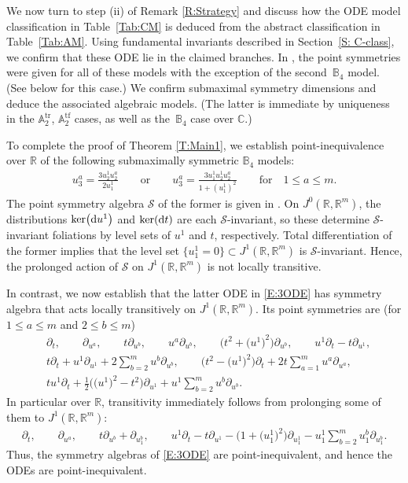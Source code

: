 \documentclass[10pt,a4paper]{amsart}
\newcommand\cS{\mathcal{S}}
\DeclareMathOperator{\tf}{tf}
\DeclareMathOperator{\tr}{tr}
\newcommand{\R}{\mathbb{R}}
\newcommand{\C}{\mathbb{C}}
\newcommand\bbA{\mathbb{A}}
\newcommand\bbB{\mathbb{B}}
\numberwithin{equation}{section}
\begin{document}
 We now turn to step (ii) of Remark \ref{R:Strategy} and discuss how the ODE model classification in Table~\ref{Tab:CM} is deduced from the abstract classification in Table~\ref{Tab:AM}. Using fundamental invariants described in Section~\ref{S: C-class}, we confirm that these ODE lie in the claimed branches. In \cite[Table~10]{KT2021}, the point symmetries were given for all of these models with the exception of the second~$\bbB_4$ model. (See below for this case.) We confirm submaximal symmetry dimensions and deduce the associated algebraic models. (The latter is immediate by uniqueness in the $\bbA_2^{\tr}$, $\bbA_2^{\tf}$ cases, as well as the~$\bbB_4$ case over $\C$.)

To complete the proof of Theorem \ref{T:Main1}, we establish point-inequivalence over $\R$ of the following submaximally symmetric $\bbB_4$ models:
\begin{align}\label{E:3ODE}
u_3^a= \frac{3u_2^1 u_2^a}{2u^1_1} \qquad \text{or} \qquad u_3^a= \frac{3u_1^1u_2^1 u_2^a}{1 + (u^1_1)^2} \qquad \text{for}\quad 1 \leq a \leq m.
\end{align}
The point symmetry algebra $\cS$ of the former is given in \cite[Table 10]{KT2021}. On $J^0(\R,\R^m)$, the distributions $\ker\bigl({\rm d}u^1\bigr)$ and $\ker({\rm d}t)$ are each $\cS$-invariant, so these determine $\cS$-invariant foliations by level sets of $u^1$ and $t$, respectively. Total differentiation of the former implies that the level set $\bigl\{u_1^1=0\bigr\} \subset J^1(\R,\R^m)$ is $\cS$-invariant. Hence, the prolonged action of $\cS$ on $J^1(\R,\R^m)$ is not locally transitive.

In contrast, we now establish that the latter ODE in \eqref{E:3ODE} has symmetry algebra that acts locally transitively on $J^1(\R,\R^m)$. Its point symmetries are (for $1 \le a \le m$ and $2 \le b \le m$)
\begin{align*}%
&\partial_t, \qquad \partial_{u^a}, \qquad t \partial_{u^b}, \qquad u^a\partial_{u^b}, \qquad \bigl(t^2 + \bigl(u^1\bigr)^2\bigr)\partial_{u^b}, \qquad u^1\partial_t -t\partial_{u^1}, \\
& t\partial_t + u^1\partial_{u^1} + 2 \sum_{b=2}^m u^b\partial_{u^b}, \qquad \bigl(t^2-\bigl(u^1\bigr)^2\bigr)\partial_t + 2t\sum_{a=1}^m u^a \partial_{u^a}, \\
& tu^1\partial_t + \frac{1}{2}\bigl(\bigl(u^1\bigr)^2-t^2\bigr)\partial_{u^1} + u^1\sum_{b=2}^m u^b\partial_{u^b}.
\end{align*}
In particular over $\R$, transitivity immediately follows from prolonging some of them to $J^1(\R,\R^m\!)$:
\begin{align*}
 \partial_t, \qquad
 \partial_{u^a}, \qquad
 t\partial_{u^b} + \partial_{u^b_1}, \qquad
 u^1\partial_t - t\partial_{u^1} - \bigl(1 + \bigl(u^1_1\bigr)^2\bigr) \partial_{u^1_1} - u^1_1 \sum_{b=2}^m u^b_1 \partial_{u^b_1}.
\end{align*}
Thus, the symmetry algebras of \eqref{E:3ODE} are point-inequivalent, and hence the ODEs are point-inequivalent.
\end{document}
